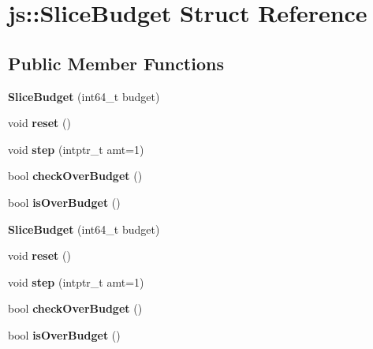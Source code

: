 \hypertarget{structjs_1_1_slice_budget}{\section{js\-:\-:Slice\-Budget Struct Reference}
\label{structjs_1_1_slice_budget}
}
\subsection*{Public Member Functions}
\begin{DoxyCompactItemize}
\item 
\hypertarget{structjs_1_1_slice_budget_a2486a098b090ded7120a2688a4778f8c}{{\bfseries Slice\-Budget} (int64\-\_\-t budget)}\label{structjs_1_1_slice_budget_a2486a098b090ded7120a2688a4778f8c}

\item 
\hypertarget{structjs_1_1_slice_budget_a84ec9407d8c96488b007709f477c7b47}{void {\bfseries reset} ()}\label{structjs_1_1_slice_budget_a84ec9407d8c96488b007709f477c7b47}

\item 
\hypertarget{structjs_1_1_slice_budget_aae62ac743c2e1f915ef2acb2d178810b}{void {\bfseries step} (intptr\-\_\-t amt=1)}\label{structjs_1_1_slice_budget_aae62ac743c2e1f915ef2acb2d178810b}

\item 
\hypertarget{structjs_1_1_slice_budget_a5d91b186b453ab99ed631e8c3f5535e5}{bool {\bfseries check\-Over\-Budget} ()}\label{structjs_1_1_slice_budget_a5d91b186b453ab99ed631e8c3f5535e5}

\item 
\hypertarget{structjs_1_1_slice_budget_a8e26d57f0a72b192315144d7f23a532c}{bool {\bfseries is\-Over\-Budget} ()}\label{structjs_1_1_slice_budget_a8e26d57f0a72b192315144d7f23a532c}

\item 
\hypertarget{structjs_1_1_slice_budget_a2486a098b090ded7120a2688a4778f8c}{{\bfseries Slice\-Budget} (int64\-\_\-t budget)}\label{structjs_1_1_slice_budget_a2486a098b090ded7120a2688a4778f8c}

\item 
\hypertarget{structjs_1_1_slice_budget_a84ec9407d8c96488b007709f477c7b47}{void {\bfseries reset} ()}\label{structjs_1_1_slice_budget_a84ec9407d8c96488b007709f477c7b47}

\item 
\hypertarget{structjs_1_1_slice_budget_aae62ac743c2e1f915ef2acb2d178810b}{void {\bfseries step} (intptr\-\_\-t amt=1)}\label{structjs_1_1_slice_budget_aae62ac743c2e1f915ef2acb2d178810b}

\item 
\hypertarget{structjs_1_1_slice_budget_a5d91b186b453ab99ed631e8c3f5535e5}{bool {\bfseries check\-Over\-Budget} ()}\label{structjs_1_1_slice_budget_a5d91b186b453ab99ed631e8c3f5535e5}

\item 
\hypertarget{structjs_1_1_slice_budget_a8e26d57f0a72b192315144d7f23a532c}{bool {\bfseries is\-Over\-Budget} ()}\label{structjs_1_1_slice_budget_a8e26d57f0a72b192315144d7f23a532c}

\end{DoxyCompactItemize}
